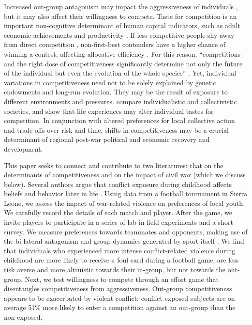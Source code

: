Increased out-group antagonism may impact the aggressiveness of individuals \citep{Miguel2011b}, but it may also affect their willingness to compete. Taste for competition is an important non-cognitive determinant of human capital indicators, such as adult economic achievements and productivity \citep{Niederle2007}. If less competitive people shy away from direct competition \citep{Bartling2012}, non-first-best contenders have a higher chance of winning a contest, affecting allocative efficiency \citep{Eriksson2009a}. For this reason, “competitions and the right dose of competitiveness significantly determine not only the future of the individual but even the evolution of the whole species” \citep{Leibbrandt2013}. Yet, individual variations in competitiveness need not to be solely explained by genetic endowments and long-run evolution. They may be the result of exposure to different environments and pressures. \cite{Leibbrandt2013} compare individualistic and collectivistic societies, and show that life experiences may alter individual tastes for competition.  In conjunction with altered preferences for local collective action and trade-offs over risk and time, shifts in competitiveness may be a crucial determinant of regional post-war political and economic recovery and development. 

This paper seeks to connect and contribute to two literatures: that on the determinants of competitiveness and on the impact of civil war (which we discuss below). Several authors argue that conflict exposure during childhood affects beliefs and behavior later in life \citep[see][for a review]{Adhvaryu2013}. Using data from a football tournament in Sierra Leone, we assess the impact of war-related violence on preferences of local youth. We carefully record the details of each match and player. After the game, we invite players to participate in a series of lab-in-field experiments and a short survey. We measure preferences towards teammates and opponents, making use of the bi-lateral antagonism and group dynamics generated by sport itself \citep[see][]{Weinstein1995a,Duggan2002a,Garicano2006,Miguel2011b}. We find that individuals who experienced more intense conflict-related violence during childhood are more likely to receive a foul card during a football game, are less risk averse and more altruistic towards their in-group, but not towards the out-group. Next, we test willingness to compete through an effort game that disentangles competitiveness from aggressiveness. Out-group competitiveness appears to be exacerbated by violent conflict: conflict exposed subjects are on average 51\% more likely to enter a competition against an out-group than the non-exposed. 

